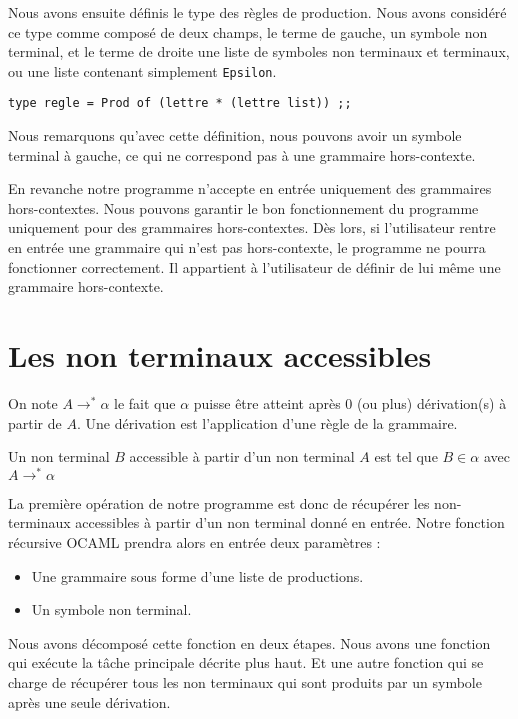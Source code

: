 \documentclass[11pt,a4paper]{article}
\def\code#1{\texttt{#1}} %
\begin{document}
Nous avons ensuite définis le type des règles de production.
Nous avons considéré ce type comme composé de deux champs, le
terme de gauche, un symbole non terminal, et le terme de droite
une liste de symboles non terminaux et terminaux, ou une liste 
contenant simplement \code{Epsilon}.

\begin{verbatim}
type regle = Prod of (lettre * (lettre list)) ;;
\end{verbatim}

Nous remarquons qu'avec cette définition, nous pouvons
avoir un symbole terminal à gauche, ce qui ne correspond pas
à une grammaire hors-contexte.

En revanche notre programme n'accepte en entrée uniquement des
grammaires hors-contextes. Nous pouvons garantir le bon fonctionnement
du programme uniquement pour des grammaires hors-contextes.
Dès lors, si l'utilisateur rentre en entrée une grammaire qui
n'est pas hors-contexte, le programme ne pourra fonctionner 
correctement. Il appartient à l'utilisateur de définir de lui même une grammaire hors-contexte.

\newpage


\section{Les non terminaux accessibles}

On note $A \rightarrow^* \alpha$ le fait que $\alpha$ puisse être atteint après 
0 (ou plus) dérivation(s) à partir de $A$. Une dérivation est l'application d'une règle de la grammaire.

Un non terminal $B$ accessible à partir d'un non terminal $A$ est tel que
$B \in \alpha$ avec $A \rightarrow^* \alpha$
\newline

La première opération de notre programme est donc de récupérer les
non-terminaux accessibles à partir d'un non terminal donné 
en entrée. Notre fonction récursive OCAML prendra alors en 
entrée deux paramètres : 
\begin{itemize}
    \item Une grammaire sous forme d'une liste de productions.
    \item Un symbole non terminal.
\end{itemize}

Nous avons décomposé cette fonction en deux étapes. Nous avons une 
fonction qui exécute la tâche principale décrite plus haut. Et une 
autre fonction qui se charge de récupérer tous les non terminaux
qui sont produits par un symbole après une seule dérivation.
\end{document}
